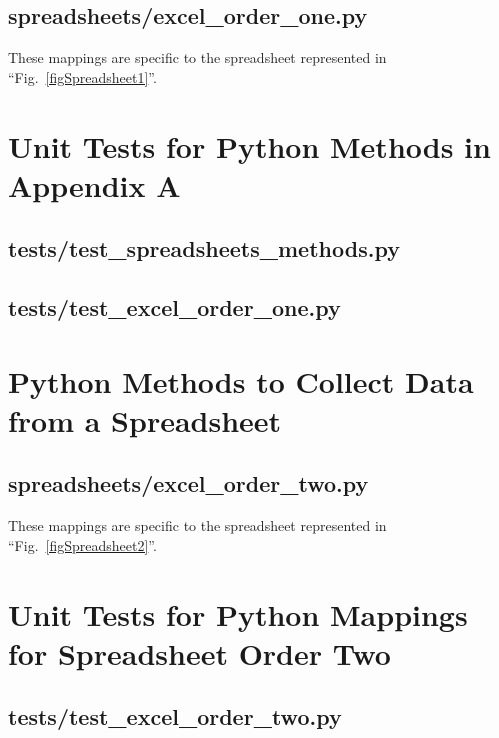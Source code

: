 \documentclass[conference]{IEEEtran}
\begin{document}
    \newpage
    \subsection{spreadsheets/excel\_order\_one.py}
    These mappings are specific to the spreadsheet represented in ``Fig.~\ref{figSpreadsheet1}''.
    

\newpage
\section{Unit Tests for Python Methods in Appendix A} \label{appendixOrderOneTests}
    \subsection{tests/test\_spreadsheets\_methods.py}
    

    \newpage
    \subsection{tests/test\_excel\_order\_one.py}
    

% 
% 

\newpage
\section{Python Methods to Collect Data from a Spreadsheet} \label{appendixOrderTwo}
    \subsection{spreadsheets/excel\_order\_two.py}
    These mappings are specific to the spreadsheet represented in ``Fig.~\ref{figSpreadsheet2}''.
    

\newpage
\section{Unit Tests for Python Mappings for Spreadsheet Order Two} \label{appendixOrderTwoTests}
    \subsection{tests/test\_excel\_order\_two.py}
    
\end{document}
